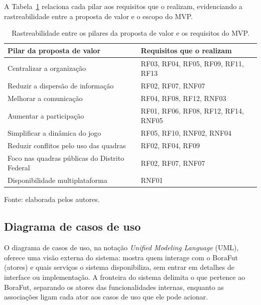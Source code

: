       A Tabela~\ref{tab:rastro-valor} relaciona cada pilar aos requisitos que o realizam, evidenciando a rastreabilidade entre a proposta de valor e o escopo do MVP.

      \begin{table}[!htb]
        \centering
        \caption{Rastreabilidade entre os pilares da proposta de valor e os requisitos do MVP.}
        \label{tab:rastro-valor}
        \footnotesize
        \renewcommand{\arraystretch}{1.3}
        \begin{tabular}{p{6cm}p{7.5cm}}
        \toprule
        \textbf{Pilar da proposta de valor} & \textbf{Requisitos que o realizam} \\
        \midrule
        Centralizar a organização & RF03, RF04, RF05, RF09, RF11, RF13 \\
        Reduzir a dispersão de informação & RF02, RF07, RNF07 \\
        Melhorar a comunicação & RF04, RF08, RF12, RNF03 \\
        Aumentar a participação & RF01, RF06, RF08, RF12, RF14, RNF05 \\
        Simplificar a dinâmica do jogo & RF05, RF10, RNF02, RNF04 \\
        Reduzir conflitos pelo uso das quadras & RF02, RF04, RF09 \\
        Foco nas quadras públicas do Distrito Federal & RF02, RF07, RNF07 \\
        Disponibilidade multiplataforma & RNF01 \\
        \bottomrule
        \end{tabular}

        \vspace{2pt}
        {\footnotesize Fonte: elaborada pelos autores.}
      \end{table}

    \subsection{Diagrama de casos de uso}

      O diagrama de casos de uso, na notação \textit{Unified Modeling Language} (UML), oferece uma visão externa do sistema: mostra quem interage com o BoraFut (atores) e quais serviços o sistema disponibiliza, sem entrar em detalhes de interface ou implementação. A fronteira do sistema delimita o que pertence ao BoraFut, separando os atores das funcionalidades internas, enquanto as associações ligam cada ator aos casos de uso que ele pode acionar.

